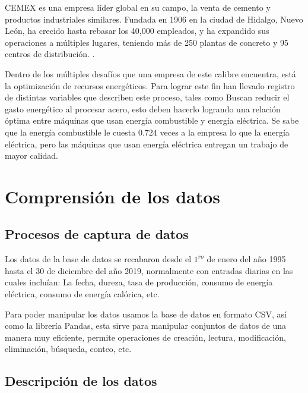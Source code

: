 \documentclass{article}
\begin{document}
CEMEX es una empresa líder global en su campo, la venta de cemento y productos industriales similares. Fundada en 1906 en la ciudad de Hidalgo, Nuevo León, ha crecido hasta rebasar los 40,000 empleados, y ha expandido sus operaciones a múltiples lugares, teniendo más de 250 plantas de concreto y 95 centros de distribución. \cite{cemex}. 

Dentro de los múltiples desafíos que una empresa de este calibre encuentra, está la optimización de recursos energéticos. Para lograr este fin han llevado registro de distintas variables que describen este proceso, tales como 
Buscan reducir el gasto energético al procesar acero, esto deben hacerlo logrando una relación óptima entre máquinas que usan energía combustible y energía eléctrica. Se sabe que la energía combustible le cuesta $0.724$ veces a la empresa lo que la energía eléctrica, pero las máquinas que usan energía eléctrica entregan un trabajo de mayor calidad. \cite{reto} 

\section{Comprensión de los datos}


\subsection{Procesos de captura de datos}


Los datos de la base de datos se recabaron desde el $1^{ro}$ de enero del año 1995 hasta el 30 de diciembre del año 2019, normalmente con entradas diarias en las cuales incluían: La fecha, dureza, tasa de producción, consumo de energía eléctrica, consumo de energía calórica, etc.

Para poder manipular los datos usamos la base de datos en formato CSV, así como la librería Pandas, esta sirve para manipular conjuntos de datos de una manera muy eficiente, permite operaciones de creación, lectura, modificación, eliminación, búsqueda, conteo, etc. \cite{reback2020pandas}


\subsection{Descripción de los datos}
\end{document}
